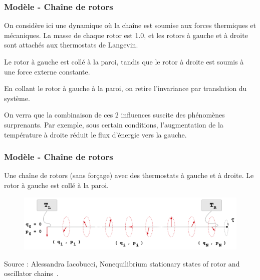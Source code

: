 \begin{frame}

    \frametitle{Modèle - Chaîne de rotors}

    On considère ici une dynamique où la chaîne est soumise aux forces
    thermiques et mécaniques. La masse de chaque rotor est 1.0, et les
    rotors à gauche et à droite sont attachés aux thermostats de
    Langevin.

    Le rotor à gauche est collé à la paroi, tandis que le rotor à
    droite est soumis à une force externe constante.

    En collant le rotor à gauche à la paroi, on retire l'invariance
    par translation du système.



    On verra que la combinaison de ces 2 influences suscite des
    phénomènes surprenants. Par exemple, sous certain conditions,
    l'augmentation de la température à droite \alert{réduit} le flux
    d'énergie vers la gauche.

\end{frame}


\begin{frame}

    \frametitle{Modèle - Chaîne de rotors}

    Une chaîne de rotors (sans forçage) avec des thermostats à
    gauche et à droite. Le rotor à gauche est collé à la paroi.

    \begin{figure} %
        \centering
        \includegraphics[scale=0.24]{images/rotor_chain.png}
    \end{figure}

    Source : Alessandra Iacobucci, Nonequilibrium stationary states of
    rotor and oscillator chains~\cite{Iacobucci_2011}.

\end{frame}

